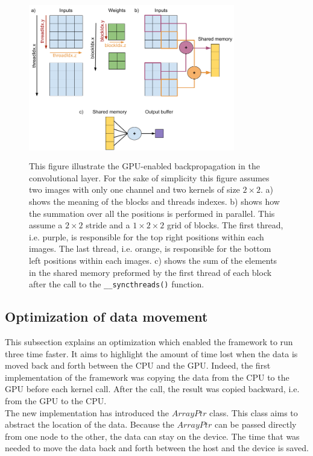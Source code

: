 \documentclass[11pt]{report}
\begin{document}
\begin{figure}[h]
\centering
\includegraphics[width=9cm, height=7cm]{conv2d_backpropagation}
\caption[Illustration of the GPU-enabled backpropagation in convolutional layer]{This figure illustrate the GPU-enabled backpropagation in the convolutional layer. For the sake of simplicity this figure assumes two images with only one channel and two kernels of size $2\times2$. a) shows the meaning of the blocks and threads indexes. b) shows how the summation over all the positions is performed in parallel. This assume a $2\times2$ stride and a $1\times2\times2$ grid of blocks. The first thread, i.e. purple, is responsible for the top right positions within each images. The last thread, i.e. orange, is responsible for the bottom left positions within each images. c) shows the sum of the elements in the shared memory preformed by the first thread of each block after the call to the \texttt{__syncthreads()} function.}
\label{fig:conv2d_backpropagation}
\end{figure}

\subsection{Optimization of data movement}

This subsection explains an optimization which enabled the framework to run three time faster. It aims to highlight the amount of time lost when the data is moved back and forth between the CPU and the GPU. Indeed, the first implementation of the framework was copying the data from the CPU to the GPU before each kernel call. After the call, the result was copied backward, i.e. from the GPU to the CPU.
\\

\noindent The new implementation has introduced the $ArrayPtr$ class. This class aims to abstract the location of the data. Because the $ArrayPtr$ can be passed directly from one node to the other, the data can stay on the device. The time that was needed to move the data back and forth between the host and the device is saved.
\end{document}
